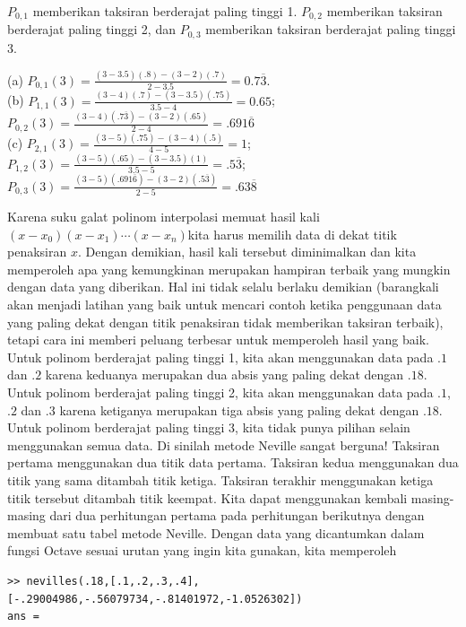 \begin{description}
$P_{0,1}$ memberikan taksiran berderajat paling tinggi 1. $P_{0,2}$
memberikan taksiran berderajat paling tinggi 2, dan $P_{0,3}$ memberikan
taksiran berderajat paling tinggi 3.

(a) $P_{0,1}(3)=\frac{(3-3.5)(.8)-(3-2)(.7)}{2-3.5}=0.7\overline{3}$.\\
(b) $P_{1,1}(3)=\frac{(3-4)(.7)-(3-3.5)(.75)}{3.5-4}=0.65$; $P_{0,2}(3)=\frac{(3-4)(.7\overline{3})-(3-2)(.65)}{2-4}=.691\overline{6}$\\
(c) $P_{2,1}(3)=\frac{(3-5)(.75)-(3-4)(.5)}{4-5}=1$; $P_{1,2}(3)=\frac{(3-5)(.65)-(3-3.5)(1)}{3.5-5}=.5\overline{3}$;
$P_{0,3}(3)=\frac{(3-5)(.691\overline{6})-(3-2)(.5\overline{3})}{2-5}=.63\overline{8}$
\item [{\ref{exc:interpolation-lagrange-10}:}] Karena suku galat polinom
interpolasi memuat hasil kali $(x-x_{0})(x-x_{1})\cdots(x-x_{n})$kita
harus memilih data di dekat titik penaksiran $x$. Dengan demikian,
hasil kali tersebut diminimalkan dan kita memperoleh apa yang kemungkinan
merupakan hampiran terbaik yang mungkin dengan data yang diberikan.
Hal ini tidak selalu berlaku demikian (barangkali akan menjadi latihan
yang baik untuk mencari contoh ketika penggunaan data yang paling
dekat dengan titik penaksiran tidak memberikan taksiran terbaik),
tetapi cara ini memberi peluang terbesar untuk memperoleh hasil yang
baik. Untuk polinom berderajat paling tinggi 1, kita akan menggunakan
data pada $.1$ dan $.2$ karena keduanya merupakan dua absis yang
paling dekat dengan $.18$. Untuk polinom berderajat paling tinggi
2, kita akan menggunakan data pada $.1$, $.2$ dan $.3$ karena ketiganya
merupakan tiga absis yang paling dekat dengan $.18$. Untuk polinom
berderajat paling tinggi 3, kita tidak punya pilihan selain menggunakan
semua data. Di sinilah metode Neville sangat berguna! Taksiran pertama
menggunakan dua titik data pertama. Taksiran kedua menggunakan dua
titik yang sama ditambah titik ketiga. Taksiran terakhir menggunakan
ketiga titik tersebut ditambah titik keempat. Kita dapat menggunakan
kembali masing-masing dari dua perhitungan pertama pada perhitungan
berikutnya dengan membuat satu tabel metode Neville. Dengan data yang
dicantumkan dalam fungsi Octave sesuai urutan yang ingin kita gunakan,
kita memperoleh \begin{verbatim}
>> nevilles(.18,[.1,.2,.3,.4],[-.29004986,-.56079734,-.81401972,-1.0526302])
ans =


\end{verbatim}
\end{description}
